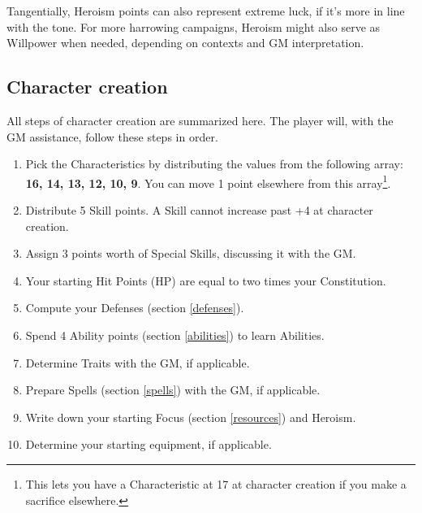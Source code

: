 Tangentially, Heroism points can also represent extreme luck, if it's more in line with the tone. For more harrowing campaigns, Heroism might also serve as Willpower when needed, depending on contexts and GM interpretation.

\subsection{Character creation}
\label{character_creation}

All steps of character creation are summarized here. The player will, with the GM assistance, follow these steps in order.

\begin{enumerate}
    \item Pick the Characteristics by distributing the values from the following array: \textbf{16, 14, 13, 12, 10, 9}. You can move 1 point elsewhere from this array\footnote{This lets you have a Characteristic at 17 at character creation if you make a sacrifice elsewhere.}.
    \item Distribute 5 Skill points. A Skill cannot increase past +4 at character creation.
    \item Assign 3 points worth of Special Skills, discussing it with the GM.
    \item Your starting Hit Points (HP) are equal to two times your Constitution.
    \item Compute your Defenses (section \ref{defenses}).
	\item Spend 4 Ability points (section \ref{abilities}) to learn Abilities. 
    \item Determine Traits with the GM, if applicable.
    \item Prepare Spells (section \ref{spells}) with the GM, if applicable.
	\item Write down your starting Focus (section \ref{resources}) and Heroism.
    \item Determine your starting equipment, if applicable. 
\end{enumerate}
















